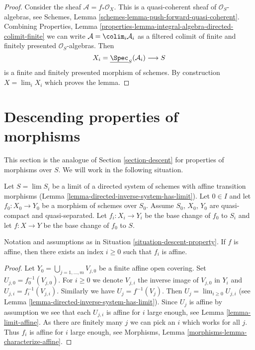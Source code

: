 \begin{proof}
Consider the sheaf $\mathcal{A} = f_*\mathcal{O}_X$.
This is a quasi-coherent sheaf of $\mathcal{O}_S$-algebras, see
Schemes, Lemma \ref{schemes-lemma-push-forward-quasi-coherent}.
Combining
Properties, Lemma
\ref{properties-lemma-integral-algebra-directed-colimit-finite}
we can write $\mathcal{A} = \colim_i \mathcal{A}_i$ as a filtered
colimit of finite and finitely presented $\mathcal{O}_S$-algebras.
Then
$$
X_i = \underline{\Spec}_S(\mathcal{A}_i)
\longrightarrow
S
$$
is a finite and finitely presented morphism of schemes. By construction
$X = \lim_i X_i$ which proves the lemma.
\end{proof}








\section{Descending properties of morphisms}
\label{section-descent-of-properties}

\noindent
This section is the analogue of
Section \ref{section-descent}
for properties of morphisms over $S$.
We will work in the following situation.

\begin{situation}
\label{situation-descent-property}
Let $S = \lim S_i$ be a limit of a directed system of schemes
with affine transition morphisms
(Lemma \ref{lemma-directed-inverse-system-has-limit}).
Let $0 \in I$ and let $f_0 : X_0 \to Y_0$ be a morphism of schemes over $S_0$.
Assume $S_0$, $X_0$, $Y_0$ are quasi-compact and quasi-separated.
Let $f_i : X_i \to Y_i$ be the base change of $f_0$ to $S_i$ and
let $f : X \to Y$ be the base change of $f_0$ to $S$.
\end{situation}

\begin{lemma}
\label{lemma-descend-affine-finite-presentation}
Notation and assumptions as in Situation \ref{situation-descent-property}.
If $f$ is affine, then there exists an index $i \geq 0$
such that $f_i$ is affine.
\end{lemma}

\begin{proof}
Let $Y_0 = \bigcup_{j = 1, \ldots, m} V_{j, 0}$ be a finite affine
open covering. Set $U_{j, 0} = f_0^{-1}(V_{j, 0})$. For $i \geq 0$
we denote $V_{j, i}$ the inverse image of $V_{j, 0}$ in $Y_i$ and
$U_{j, i} = f_i^{-1}(V_{j, i})$. Similarly we have
$U_j = f^{-1}(V_j)$. Then $U_j = \lim_{i \geq 0} U_{j, i}$
(see Lemma \ref{lemma-directed-inverse-system-has-limit}).
Since $U_j$ is affine by assumption we see that
each $U_{j, i}$ is affine for $i$ large enough, see
Lemma \ref{lemma-limit-affine}. As there are finitely many $j$ we
can pick an $i$ which works for all $j$. Thus $f_i$ is
affine for $i$ large enough, see
Morphisms, Lemma \ref{morphisms-lemma-characterize-affine}.
\end{proof}


